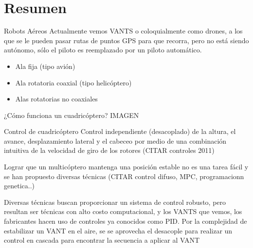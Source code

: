 \documentclass[
	11pt, %
]{beamer}
\begin{document}


\section{Resumen}

\begin{frame}{Robots A\'{e}reos}
  Actualmente vemos VANTS o coloquialmente como drones, a los que se le pueden pasar rutas de puntos GPS para que recorra, pero no est\'{a} siendo aut\'{o}nomo, sólo el piloto es reemplazado por un piloto autom\'{a}tico.
  \begin{itemize}
  \item Ala fija (tipo avi\'{o}n)
  \item Ala rotatoria coaxial (tipo helic\'{o}ptero)
  \item Alas rotatorias no coaxiales
  \end{itemize}
\end{frame}

\begin{frame}{¿C\'{o}mo funciona un cuadric\'{o}ptero?}
  IMAGEN
\end{frame}

\begin{frame}{Control de cuadric\'{o}ptero}
  Control independiente (desacoplado) de la altura, el avance, desplazamiento lateral y el cabeceo por medio de una combinaci\'{o}n intuitiva de la velocidad de giro de los rotores (CITAR controles 2011)
\end{frame}

\begin{frame}{}
  Lograr que un multic\'{o}ptero mantenga una posici\'{o}n estable no es una tarea f\'{a}cil y se han propuesto diversas t\'{e}cnicas (CITAR control difuso, MPC, programacionn genetica..)
\end{frame}

\begin{frame}{}
  Diversas t\'{e}cnicas buscan proporcionar un sistema de control robusto, pero resultan ser t\'{e}cnicas con alto costo computacional, y los VANTS que vemos, los fabricantes hacen uso de controles ya conocidos como PID. Por la complejidad de estabilizar un VANT en el aire, se se aprovecha el desacople para realizar un control en cascada para encontrar la secuencia a aplicar al VANT 
\end{frame}
\end{document}

